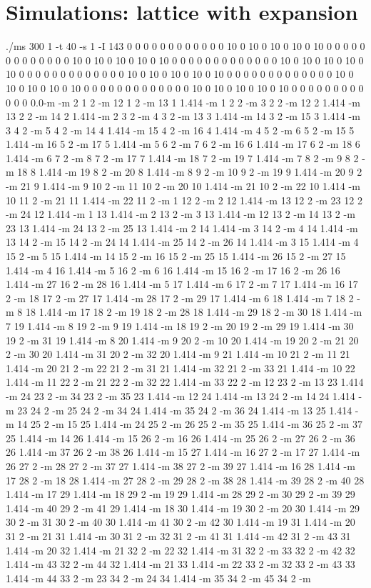 \documentclass[12pt]{article}
\begin{document}
\section*{Simulations: lattice with expansion}
./ms 300 1 -t 40 -s 1 -I 143 0 0 0 0 0 0 0 0 0 0 0 0 10 0 10 0 10 0 10 0 10 0 0 0 0 0 0 0 0 0 0 0 0 0 10 0 10 0 10 0 10 0 10 0 0 0 0 0 0 0 0 0 0 0 0 0 10 0 10 0 10 0 10 0 10 0 0 0 0 0 0 0 0 0 0 0 0 0 10 0 10 0 10 0 10 0 10 0 0 0 0 0 0 0 0 0 0 0 0 0 10 0 10 0 10 0 10 0 10 0 0 0 0 0 0 0 0 0 0 0 0 0 10 0 10 0 10 0 10 0 10 0 0 0 0 0 0 0 0 0 0 0 0 0.0-m -m 2 1 2 -m 12 1 2 -m 13 1 1.414 -m 1 2 2 -m 3 2 2 -m 12 2 1.414 -m 13 2 2 -m 14 2 1.414 -m 2 3 2 -m 4 3 2 -m 13 3 1.414 -m 14 3 2 -m 15 3 1.414 -m 3 4 2 -m 5 4 2 -m 14 4 1.414 -m 15 4 2 -m 16 4 1.414 -m 4 5 2 -m 6 5 2 -m 15 5 1.414 -m 16 5 2 -m 17 5 1.414 -m 5 6 2 -m 7 6 2 -m 16 6 1.414 -m 17 6 2 -m 18 6 1.414 -m 6 7 2 -m 8 7 2 -m 17 7 1.414 -m 18 7 2 -m 19 7 1.414 -m 7 8 2 -m 9 8 2 -m 18 8 1.414 -m 19 8 2 -m 20 8 1.414 -m 8 9 2 -m 10 9 2 -m 19 9 1.414 -m 20 9 2 -m 21 9 1.414 -m 9 10 2 -m 11 10 2 -m 20 10 1.414 -m 21 10 2 -m 22 10 1.414 -m 10 11 2 -m 21 11 1.414 -m 22 11 2 -m 1 12 2 -m 2 12 1.414 -m 13 12 2 -m 23 12 2 -m 24 12 1.414 -m 1 13 1.414 -m 2 13 2 -m 3 13 1.414 -m 12 13 2 -m 14 13 2 -m 23 13 1.414 -m 24 13 2 -m 25 13 1.414 -m 2 14 1.414 -m 3 14 2 -m 4 14 1.414 -m 13 14 2 -m 15 14 2 -m 24 14 1.414 -m 25 14 2 -m 26 14 1.414 -m 3 15 1.414 -m 4 15 2 -m 5 15 1.414 -m 14 15 2 -m 16 15 2 -m 25 15 1.414 -m 26 15 2 -m 27 15 1.414 -m 4 16 1.414 -m 5 16 2 -m 6 16 1.414 -m 15 16 2 -m 17 16 2 -m 26 16 1.414 -m 27 16 2 -m 28 16 1.414 -m 5 17 1.414 -m 6 17 2 -m 7 17 1.414 -m 16 17 2 -m 18 17 2 -m 27 17 1.414 -m 28 17 2 -m 29 17 1.414 -m 6 18 1.414 -m 7 18 2 -m 8 18 1.414 -m 17 18 2 -m 19 18 2 -m 28 18 1.414 -m 29 18 2 -m 30 18 1.414 -m 7 19 1.414 -m 8 19 2 -m 9 19 1.414 -m 18 19 2 -m 20 19 2 -m 29 19 1.414 -m 30 19 2 -m 31 19 1.414 -m 8 20 1.414 -m 9 20 2 -m 10 20 1.414 -m 19 20 2 -m 21 20 2 -m 30 20 1.414 -m 31 20 2 -m 32 20 1.414 -m 9 21 1.414 -m 10 21 2 -m 11 21 1.414 -m 20 21 2 -m 22 21 2 -m 31 21 1.414 -m 32 21 2 -m 33 21 1.414 -m 10 22 1.414 -m 11 22 2 -m 21 22 2 -m 32 22 1.414 -m 33 22 2 -m 12 23 2 -m 13 23 1.414 -m 24 23 2 -m 34 23 2 -m 35 23 1.414 -m 12 24 1.414 -m 13 24 2 -m 14 24 1.414 -m 23 24 2 -m 25 24 2 -m 34 24 1.414 -m 35 24 2 -m 36 24 1.414 -m 13 25 1.414 -m 14 25 2 -m 15 25 1.414 -m 24 25 2 -m 26 25 2 -m 35 25 1.414 -m 36 25 2 -m 37 25 1.414 -m 14 26 1.414 -m 15 26 2 -m 16 26 1.414 -m 25 26 2 -m 27 26 2 -m 36 26 1.414 -m 37 26 2 -m 38 26 1.414 -m 15 27 1.414 -m 16 27 2 -m 17 27 1.414 -m 26 27 2 -m 28 27 2 -m 37 27 1.414 -m 38 27 2 -m 39 27 1.414 -m 16 28 1.414 -m 17 28 2 -m 18 28 1.414 -m 27 28 2 -m 29 28 2 -m 38 28 1.414 -m 39 28 2 -m 40 28 1.414 -m 17 29 1.414 -m 18 29 2 -m 19 29 1.414 -m 28 29 2 -m 30 29 2 -m 39 29 1.414 -m 40 29 2 -m 41 29 1.414 -m 18 30 1.414 -m 19 30 2 -m 20 30 1.414 -m 29 30 2 -m 31 30 2 -m 40 30 1.414 -m 41 30 2 -m 42 30 1.414 -m 19 31 1.414 -m 20 31 2 -m 21 31 1.414 -m 30 31 2 -m 32 31 2 -m 41 31 1.414 -m 42 31 2 -m 43 31 1.414 -m 20 32 1.414 -m 21 32 2 -m 22 32 1.414 -m 31 32 2 -m 33 32 2 -m 42 32 1.414 -m 43 32 2 -m 44 32 1.414 -m 21 33 1.414 -m 22 33 2 -m 32 33 2 -m 43 33 1.414 -m 44 33 2 -m 23 34 2 -m 24 34 1.414 -m 35 34 2 -m 45 34 2 -m 
\end{document}
